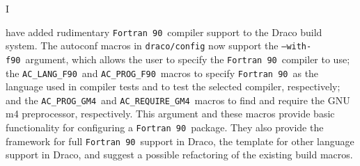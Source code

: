\documentclass[11pt]{nmemo}
\newcommand{\fninety}{\texttt{Fortran~90}}
\newcommand{\withfninety}{\texttt{--with-f90}}
\newcommand{\langfninety}{\texttt{AC\_LANG\_F90}}
\newcommand{\progfninety}{\texttt{AC\_PROG\_F90}}
\newcommand{\requiregmfour}{\texttt{AC\_REQUIRE\_GM4}}
\newcommand{\proggmfour}{\texttt{AC\_PROG\_GM4}}
\begin{document}

\subject{\fninety\ Build Support in Draco}
\date{\today}




\opening


I have added rudimentary \fninety\ compiler support to the Draco build
system\cite{draco-build}.  The autoconf\cite{autoconf} macros in
\texttt{draco/config} now support the \withfninety\ argument, which
allows the user to specify the \fninety\ compiler to use; the
\langfninety\ and \progfninety\ macros to specify \fninety\ as the
language used in compiler tests and to test the selected compiler,
respectively; and the \proggmfour\ and \requiregmfour\ macros to find
and require the GNU m4\cite{m4} preprocessor, respectively.  This
argument and these macros provide basic functionality for configuring
a \fninety\ package.  They also provide the framework for full
\fninety\ support in Draco, the template for other language support in
Draco, and suggest a possible refactoring of the existing build
macros.
\end{document}
